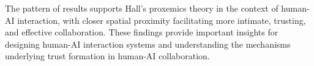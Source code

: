 \documentclass[12pt]{article}
\begin{document}
The pattern of results supports Hall's proxemics theory in the context of human-AI interaction, with closer spatial proximity facilitating more intimate, trusting, and effective collaboration. These findings provide important insights for designing human-AI interaction systems and understanding the mechanisms underlying trust formation in human-AI collaboration.
\end{document}
